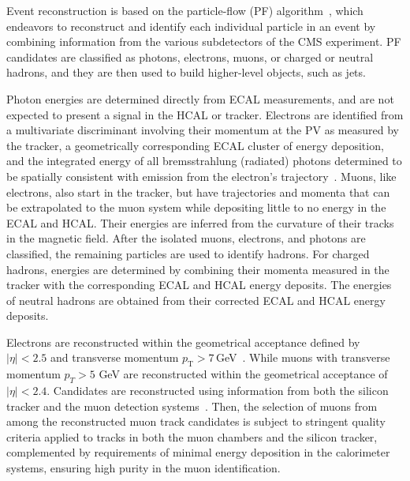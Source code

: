 Event reconstruction is based on the particle-flow (PF) algorithm~\cite{Sirunyan:2017ulk}, which endeavors to reconstruct and identify each individual particle in an event by combining information from the various subdetectors of the CMS experiment. PF candidates are classified as photons, electrons, muons, or charged or neutral hadrons, and they are then used to build higher-level objects, such as jets. 

Photon energies are determined directly from ECAL measurements, and are not expected to present a signal in the HCAL or tracker. Electrons are identified from a multivariate discriminant involving their momentum at the PV as measured by the tracker, a geometrically corresponding ECAL cluster of energy deposition, and the integrated energy of all bremsstrahlung (radiated) photons determined to be spatially consistent with emission from the electron's trajectory~\cite{Sirunyan:2021rug}. Muons, like electrons, also start in the tracker, but have trajectories and momenta that can be extrapolated to the muon system while depositing little to no energy in the ECAL and HCAL. Their energies are inferred from the curvature of their tracks in the magnetic field. After the isolated muons, electrons, and photons are classified, the remaining particles are used to identify hadrons. For charged hadrons, energies are determined by combining their momenta measured in the tracker with the corresponding ECAL and HCAL energy deposits. The energies of neutral hadrons are obtained from their corrected ECAL and HCAL energy deposits.

Electrons are reconstructed within the geometrical acceptance defined by $|\eta| < 2.5$ and transverse momentum $p_{\mathrm{T}} > 7$\,GeV~\cite{eleReco}. While muons with transverse momentum $p_T > 5$ GeV are reconstructed within the geometrical acceptance of $|\eta|< 2.4$. Candidates are reconstructed using information from both the silicon tracker and the muon detection systems~\cite{MuReco}. Then, the selection of muons from among the reconstructed muon track candidates is subject to stringent quality criteria applied to tracks in both the muon chambers and the silicon tracker, complemented by requirements of minimal energy deposition in the calorimeter systems, ensuring high purity in the muon identification.

